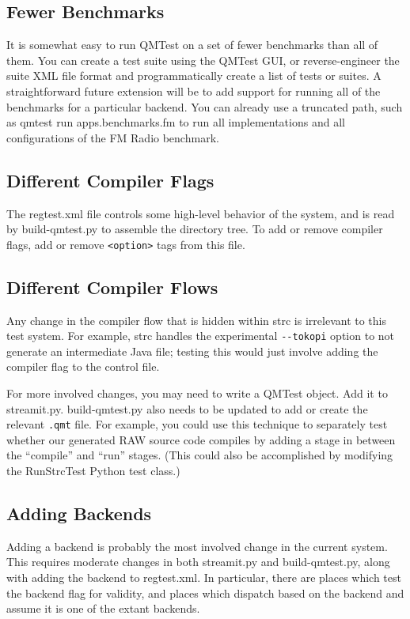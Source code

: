 \documentclass[11pt]{article}
\begin{document}
\subsection{Fewer Benchmarks}

It is somewhat easy to run QMTest on a set of fewer benchmarks than
all of them.  You can create a test suite using the QMTest GUI, or
reverse-engineer the suite XML file format and programmatically create
a list of tests or suites.  A straightforward future extension will be
to add support for running all of the benchmarks for a particular
backend.  You can already use a truncated path, such as \textsf{qmtest
  run apps.benchmarks.fm} to run all implementations and all
configurations of the FM Radio benchmark.

\subsection{Different Compiler Flags}

The \textsf{regtest.xml} file controls some high-level behavior of the
system, and is read by \textsf{build-qmtest.py} to assemble the
directory tree.  To add or remove compiler flags, add or remove
\verb|<option>| tags from this file.

\subsection{Different Compiler Flows}

Any change in the compiler flow that is hidden within \textsf{strc} is
irrelevant to this test system.  For example, \textsf{strc} handles
the experimental \verb|--tokopi| option to not generate an
intermediate Java file; testing this would just involve adding the
compiler flag to the control file.

For more involved changes, you may need to write a QMTest object.  Add
it to \textsf{streamit.py}.  \textsf{build-qmtest.py} also needs to be
updated to add or create the relevant \texttt{.qmt} file.  For
example, you could use this technique to separately test whether our
generated RAW source code compiles by adding a stage in between the
``compile'' and ``run'' stages.  (This could also be accomplished by
modifying the \textsf{RunStrcTest} Python test class.)

\subsection{Adding Backends}

Adding a backend is probably the most involved change in the current
system.  This requires moderate changes in both \textsf{streamit.py}
and \textsf{build-qmtest.py}, along with adding the backend to
\textsf{regtest.xml}.  In particular, there are places which test the
backend flag for validity, and places which dispatch based on the
backend and assume it is one of the extant backends.
\end{document}
